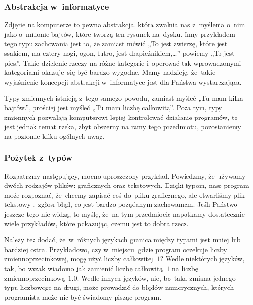 \documentclass[10pt,t]{beamer}
\begin{document}
\begin{frame}
  \frametitle{Abstrakcja w~informatyce}


  Zdjęcie na komputerze to pewna abstrakcja, która zwalnia nas z~myślenia
  o~nim jako o~milionie bajtów, które tworzą ten rysunek na~dysku. Inny
  przykładem tego typu zachowania jest to, że zamiast mówić „To jest
  zwierzę, które jest ssakiem, ma cztery nogi, ogon, futro, jest
  drapieżnikiem,\ldots” powiemy „To jest pies.”. Takie dzielenie rzeczy na różne
  kategorie i~operować tak wprowadzonymi kategoriami okazuje~się być bardzo
  wygodne. Mamy nadzieję, że~takie wyjaśnienie koncepcji abstrakcji
  w~informatyce jest dla Państwa wystarczająca.

  Typy zmiennych istnieją z~tego samego powodu, zamiast myśleć „Tu mam kilka
  bajtów.”, prościej jest myśleć „Tu mam liczbę całkowitą”. Poza tym, typy
  zmiennych pozwalają komputerowi lepiej kontrolować działanie programów,
  to jest jednak temat rzeka, zbyt obszerny na ramy tego przedmiotu,
  pozostaniemy na poziomie kilku ogólnych uwag.

\end{frame}





\begin{frame}
  \frametitle{Pożytek z~typów}


  Rozpatrzmy następujący, mocno uproszczony przykład. Powiedzmy, że~używamy
  dwóch rodzajów plików: graficznych oraz tekstowych. Dzięki typom, nasz
  program może rozpoznać, że~chcemy zapisać coś do~pliku graficznego, ale
  otwarliśmy plik tekstowy i~zgłosi błąd, co jest bardzo pożądanym
  zachowaniem. Jeśli Państwo jeszcze tego nie widzą, to myślę, że~na tym
  przedmiocie napotkamy dostatecznie wiele przykładów, które pokazując,
  czemu jest to dobra rzecz.

  Należy też dodać, że~w~różnych językach granica między typami jest mniej
  lub bardziej ostra. Przykładowo, czy w~miejscu, gdzie program oczekuje
  liczby zmiennoprzecinkowej, mogę użyć liczby całkowitej~$1$? Wedle
  niektórych języków, tak, bo wszak wiadomo jak zamienić liczbę całkowitą~$1$
  na liczbę zmiennoprzecinkową~$1.0$. Wedle innych języków, nie,
  bo~taka zmiana jednego typu liczbowego na drugi, może prowadzić do
  błędów numerycznych, których programista może nie być świadomy pisząc
  program.

\end{frame}
\end{document}
